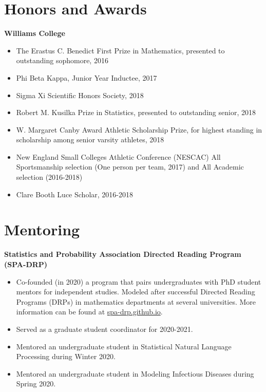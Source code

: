 \documentclass[margin, 10pt]{res} %
\begin{document}
\begin{resume}
{%


\section{Honors and Awards}
{\textbf{Williams College}}
\begin{itemize}
\item The Erastus C. Benedict First Prize in Mathematics, presented to outstanding sophomore, 2016
\item Phi Beta Kappa, Junior Year Inductee, 2017
\item Sigma Xi Scientific Honors Society, 2018
\item Robert M. Kusilka Prize in Statistics, presented to outstanding senior, 2018
\item W. Margaret Canby Award Athletic Scholarship Prize, for highest standing in scholarship among senior varsity athletes, 2018
\item New England Small Colleges Athletic Conference (NESCAC) All Sportsmanship selection (One person per team, 2017) and All Academic selection (2016-2018)
\item Clare Booth Luce Scholar, 2016-2018
\end{itemize}

\section{Mentoring}
{\textbf{Statistics and Probability Association Directed Reading Program (SPA-DRP)}}
\begin{itemize}
  \item Co-founded (in 2020) a program that pairs undergraduates with PhD student mentors for independent studies. Modeled after successful Directed Reading Programs (DRPs) in mathematics departments at several universities. More information can be found at \url{spa-drp.github.io}. 
  \item Served as a graduate student coordinator for 2020-2021. 
      \item Mentored an undergraduate student in Statistical Natural Language Processing during Winter 2020. 
     \item Mentored an undergraduate student in Modeling Infectious Diseases during Spring 2020. 
    \end{itemize}



}
\end{resume}
\end{document}

